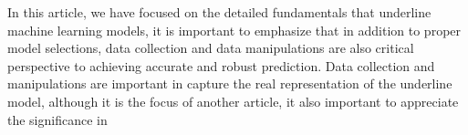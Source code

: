 
\par
In this article, we have focused on the detailed fundamentals that underline machine learning models, it is important to emphasize that in addition to proper model selections, data collection and data manipulations are also critical perspective to achieving accurate and robust prediction. Data collection and manipulations are important in capture the real representation of the underline model, although it is the focus of another article, it also important to appreciate the significance in 
\par 
